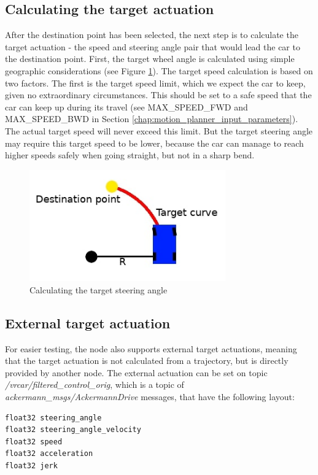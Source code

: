 \subsection{Calculating the target actuation}
After the destination point has been selected, the next step is to calculate the target actuation - the speed and steering angle pair that would lead the car to the destination point. First, the target wheel angle is calculated using simple geographic considerations (see Figure \ref{calc_steering_angle}). The target speed calculation is based on two factors. The first is the target speed limit, which we expect the car to keep, given no extraordinary circumstances. This should be set to a safe speed that the car can keep up during its travel (see MAX\_SPEED\_FWD and MAX\_SPEED\_BWD in Section \ref{chap:motion_planner_input_parameters}). The actual target speed will never exceed this limit. But the target steering angle may require this target speed to be lower, because the car can manage to reach higher speeds safely when going straight, but not in a sharp bend.

\begin{figure}[!ht]
    \centering
    \includegraphics[height=48mm]{figures/raw/jpeg/calc_steering_angle.jpg}
    \caption{Calculating the target steering angle}
    \label{calc_steering_angle}
\end{figure}

\subsection{External target actuation}
For easier testing, the node also supports external target actuations, meaning that the target actuation is not calculated from a trajectory, but is directly provided by another node. The external actuation can be set on topic \textit{/vrcar/filtered\_control\_orig}, which is a topic of \textit{ackermann\_msgs/AckermannDrive} \cite{ros_msg_AckermannDrive} messages, that have the following layout:

\begin{minipage}{\textwidth}
\begin{lstlisting}[language=IDL]
float32 steering_angle
float32 steering_angle_velocity
float32 speed
float32 acceleration
float32 jerk
\end{lstlisting}
\end{minipage}

